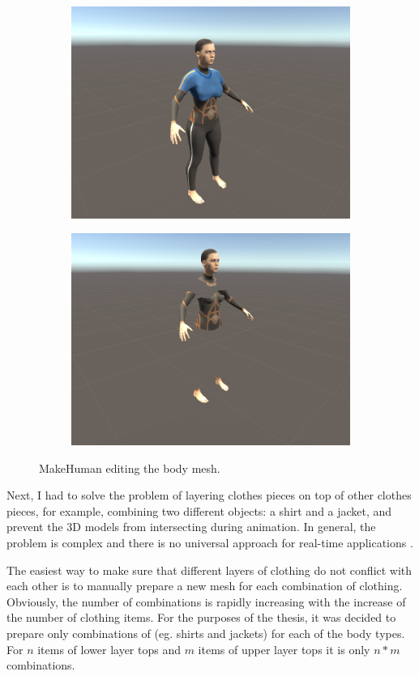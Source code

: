 \documentclass[a4paper]{report}
\begin{document}
\begin{figure}[H]
\centering
    \begin{subfigure}{\textwidth}
      \centering
      \includegraphics[width=.45\textwidth , keepaspectratio]{images/ClothesDemos/normal_meshes.png}
    \end{subfigure}%
    \begin{subfigure}{\textwidth}
      \centering
      \includegraphics[width=.45\textwidth , keepaspectratio]{images/ClothesDemos/normal_body_mesh_some_faces_cut.png.png.png}
    \end{subfigure}
\caption{MakeHuman editing the body mesh.}
\label{fig:bodymesh_edit}
\end{figure}
 
Next, I had to solve the problem of layering clothes pieces on top of other clothes pieces, for example, combining two different objects: a shirt and a jacket, and prevent the 3D models from intersecting during animation. In general, the problem is complex and there is no universal approach for real-time applications \cite{layeredClothing}.

The easiest way to make sure that different layers of clothing do not conflict with each other is to manually prepare a new mesh for each combination of clothing. Obviously, the number of combinations is rapidly increasing with the increase of the number of clothing items. For the purposes of the thesis, it was decided to prepare only combinations of  (eg. shirts and jackets) for each of the body types. For $n$ items of lower layer tops and $m$ items of upper layer tops it is only $n*m$ combinations. 
\end{document}

